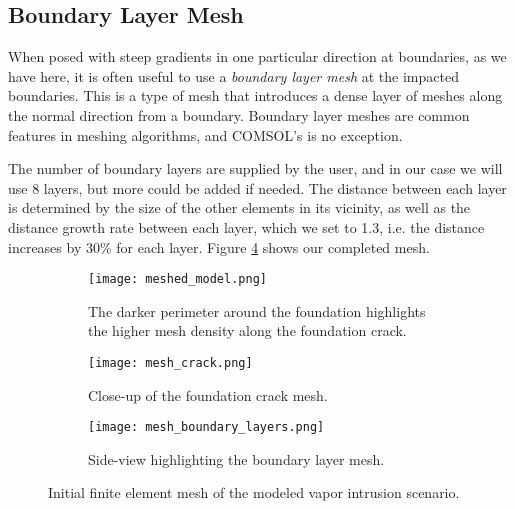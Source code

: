 \subsection{Boundary Layer Mesh}

When posed with steep gradients in one particular direction at boundaries, as we have here, it is often useful to use a \textit{boundary layer mesh} at the impacted boundaries.
This is a type of mesh that introduces a dense layer of meshes along the normal direction from a boundary.
Boundary layer meshes are common features in meshing algorithms, and COMSOL's is no exception.\par

The number of boundary layers are supplied by the user, and in our case we will use 8 layers, but more could be added if needed.
The distance between each layer is determined by the size of the other elements in its vicinity, as well as the distance growth rate between each layer, which we set to 1.3, i.e. the distance increases by 30\% for each layer.
Figure \ref{fig:mesh} shows our completed mesh.\par

\begin{figure}[htb!]
  \centering
  \begin{subfigure}[b]{\textwidth}
    \centering
    \texttt{[image: meshed\_model.png]}
    \caption{The darker perimeter around the foundation highlights the higher mesh density along the foundation crack.}
    \label{fig:meshed_geometry}
  \end{subfigure}
  \begin{subfigure}[b]{\textwidth}
    \centering
    \texttt{[image: mesh\_crack.png]}
    \caption{Close-up of the foundation crack mesh.}
    \label{fig:meshed_crack}
  \end{subfigure}
  \begin{subfigure}[b]{\textwidth}
    \centering
    \texttt{[image: mesh\_boundary\_layers.png]}
    \caption{Side-view highlighting the boundary layer mesh.}
    \label{fig:mesh_boundary_layers}
  \end{subfigure}
  \caption[Initial finite element mesh of the modeled vapor intrusion scenario.]{Initial finite element mesh of the modeled vapor intrusion scenario.}
  \label{fig:mesh}
\end{figure}
